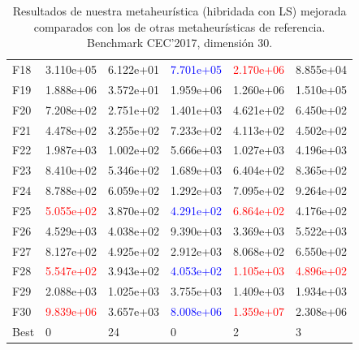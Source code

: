 \documentclass{article}
\begin{document}
\begin{table}[H]
\begin{tabular}{|l|lllll|}
F18  &  3.110e+05 &  6.122e+01 &  \textcolor{blue}{7.701e+05} &  \textcolor{red}{2.170e+06} &  8.855e+04 \\
F19  &  1.888e+06 &  3.572e+01 &  1.959e+06 &  1.260e+06 &  1.510e+05 \\
F20  &  7.208e+02 &  2.751e+02 &  1.401e+03 &  4.621e+02 &  6.450e+02 \\
F21  &  4.478e+02 &  3.255e+02 &  7.233e+02 &  4.113e+02 &  4.502e+02 \\
F22  &  1.987e+03 &  1.002e+02 &  5.666e+03 &  1.027e+03 &  4.196e+03 \\
F23  &  8.410e+02 &  5.346e+02 &  1.689e+03 &  6.404e+02 &  8.365e+02 \\
F24  &  8.788e+02 &  6.059e+02 &  1.292e+03 &  7.095e+02 &  9.264e+02 \\
F25  &  \textcolor{red}{5.055e+02} &  3.870e+02 &  \textcolor{blue}{4.291e+02} &  \textcolor{red}{6.864e+02} &  4.176e+02 \\
F26  &  4.529e+03 &  4.038e+02 &  9.390e+03 &  3.369e+03 &  5.522e+03 \\
F27  &  8.127e+02 &  4.925e+02 &  2.912e+03 &  8.068e+02 &  6.550e+02 \\
F28  &  \textcolor{red}{5.547e+02} &  3.943e+02 &  \textcolor{blue}{4.053e+02} &  \textcolor{red}{1.105e+03} &  \textcolor{red}{4.896e+02} \\
F29  &  2.088e+03 &  1.025e+03 &  3.755e+03 &  1.409e+03 &  1.934e+03 \\
F30  &  \textcolor{red}{9.839e+06} &  3.657e+03 &  \textcolor{blue}{8.008e+06} &  \textcolor{red}{1.359e+07} &  2.308e+06 \\\hline
Best &          0 &         24 &          0 &          2 &          3 \\		
		\hline
	\end{tabular}
	\caption{Resultados de nuestra metaheurística (hibridada con LS) mejorada comparados con los de otras metaheurísticas de referencia. Benchmark CEC'2017, dimensión 30.}
	\label{tab:hybrid2-30}
\end{table}
\end{document}

